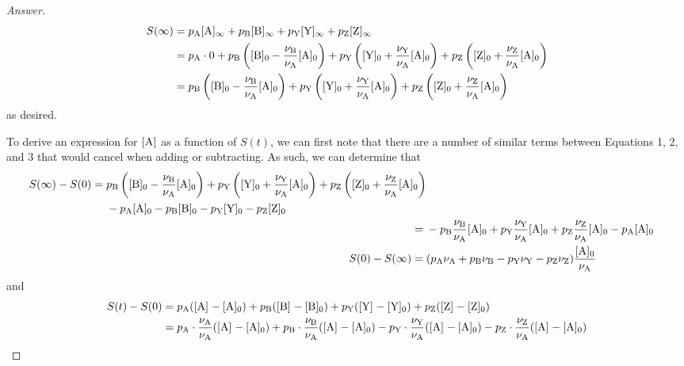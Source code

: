\documentclass[../psets.tex]{subfiles}
\begin{document}
\begin{enumerate}[label={\textbf{28-\arabic*.}},leftmargin=3.5em]
\begin{proof}[Answer]
\begin{align*}
            S(\infty) &= p_{\ce{A}}\cnc[$\infty$]{A}+p_{\ce{B}}\cnc[$\infty$]{B}+p_{\ce{Y}}\cnc[$\infty$]{Y}+p_{\ce{Z}}\cnc[$\infty$]{Z}\\
            &= p_{\ce{A}}\cdot 0+p_{\ce{B}}\left( \cnc[0]{B}-\frac{\nu_{\ce{B}}}{\nu_{\ce{A}}}\cnc[0]{A} \right)+p_{\ce{Y}}\left( \cnc[0]{Y}+\frac{\nu_{\ce{Y}}}{\nu_{\ce{A}}}\cnc[0]{A} \right)+p_{\ce{Z}}\left( \cnc[0]{Z}+\frac{\nu_{\ce{Z}}}{\nu_{\ce{A}}}\cnc[0]{A} \right)\\
            &= p_{\ce{B}}\left( \cnc[0]{B}-\frac{\nu_{\ce{B}}}{\nu_{\ce{A}}}\cnc[0]{A} \right)+p_{\ce{Y}}\left( \cnc[0]{Y}+\frac{\nu_{\ce{Y}}}{\nu_{\ce{A}}}\cnc[0]{A} \right)+p_{\ce{Z}}\left( \cnc[0]{Z}+\frac{\nu_{\ce{Z}}}{\nu_{\ce{A}}}\cnc[0]{A} \right)
        \end{align*}
        as desired.\par
        To derive an expression for $\cnc{A}$ as a function of $S(t)$, we can first note that there are a number of similar terms between Equations 1, 2, and 3 that would cancel when adding or subtracting. As such, we can determine that
        \begin{align*}
            \begin{split}
                S(\infty)-S(0) ={}& p_{\ce{B}}\left( \cnc[0]{B}-\frac{\nu_{\ce{B}}}{\nu_{\ce{A}}}\cnc[0]{A} \right)+p_{\ce{Y}}\left( \cnc[0]{Y}+\frac{\nu_{\ce{Y}}}{\nu_{\ce{A}}}\cnc[0]{A} \right)+p_{\ce{Z}}\left( \cnc[0]{Z}+\frac{\nu_{\ce{Z}}}{\nu_{\ce{A}}}\cnc[0]{A} \right)\\
                &-p_{\ce{A}}\cnc[0]{A}-p_{\ce{B}}\cnc[0]{B}-p_{\ce{Y}}\cnc[0]{Y}-p_{\ce{Z}}\cnc[0]{Z}
            \end{split}\\
            ={}& -p_{\ce{B}}\frac{\nu_{\ce{B}}}{\nu_{\ce{A}}}\cnc[0]{A}+p_{\ce{Y}}\frac{\nu_{\ce{Y}}}{\nu_{\ce{A}}}\cnc[0]{A}+p_{\ce{Z}}\frac{\nu_{\ce{Z}}}{\nu_{\ce{A}}}\cnc[0]{A}-p_{\ce{A}}\cnc[0]{A}\\
            S(0)-S(\infty) ={}& (p_{\ce{A}}\nu_{\ce{A}}+p_{\ce{B}}\nu_{\ce{B}}-p_{\ce{Y}}\nu_{\ce{Y}}-p_{\ce{Z}}\nu_{\ce{Z}})\frac{\cnc[0]{A}}{\nu_{\ce{A}}}
        \end{align*}
        and
        \begin{align*}
            S(t)-S(0) &= p_{\ce{A}}(\cnc{A}-\cnc[0]{A})+p_{\ce{B}}(\cnc{B}-\cnc[0]{B})+p_{\ce{Y}}(\cnc{Y}-\cnc[0]{Y})+p_{\ce{Z}}(\cnc{Z}-\cnc[0]{Z})\\
            &= p_{\ce{A}}\cdot\frac{\nu_{\ce{A}}}{\nu_{\ce{A}}}(\cnc{A}-\cnc[0]{A})+p_{\ce{B}}\cdot\frac{\nu_{\ce{B}}}{\nu_{\ce{A}}}(\cnc{A}-\cnc[0]{A})-p_{\ce{Y}}\cdot\frac{\nu_{\ce{Y}}}{\nu_{\ce{A}}}(\cnc{A}-\cnc[0]{A})-p_{\ce{Z}}\cdot\frac{\nu_{\ce{Z}}}{\nu_{\ce{A}}}(\cnc{A}-\cnc[0]{A})\\

\end{align*}
\end{proof}
\end{enumerate}
\end{document}

